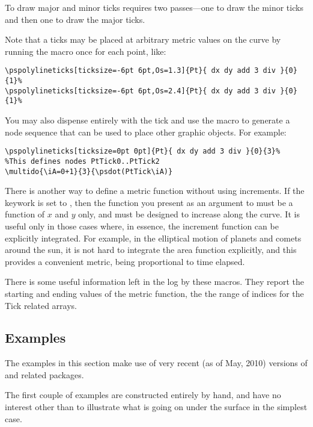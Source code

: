 \documentclass[11pt,english,BCOR10mm,DIV12,bibliography=totoc,parskip=false,smallheadings
    headexclude,footexclude,oneside]{pst-doc}
\begin{document}
To draw major and minor ticks requires two passes---one to draw the minor ticks and then one to draw the major ticks.

Note that a ticks may be placed at arbitrary metric values on the curve by running the macro once for each point, like:
\begin{verbatim}
\pspolylineticks[ticksize=-6pt 6pt,Os=1.3]{Pt}{ dx dy add 3 div }{0}{1}%
\pspolylineticks[ticksize=-6pt 6pt,Os=2.4]{Pt}{ dx dy add 3 div }{0}{1}%
\end{verbatim}

You may also dispense entirely with the tick and use the macro to generate a node sequence 
that can be used to place other graphic objects. For example:
\begin{verbatim}
\pspolylineticks[ticksize=0pt 0pt]{Pt}{ dx dy add 3 div }{0}{3}%
%This defines nodes PtTick0..PtTick2
\multido{\iA=0+1}{3}{\psdot(PtTick\iA)}
\end{verbatim}


There is another way to define a metric function without using increments. If the keywork  is set to \true, 
then the function you present as an argument to  must be a function of 
$x$ and $y$ only, and must be designed to increase along the curve. It is useful only in 
those cases where, in essence, the increment function can be explicitly integrated. 
For example, in the elliptical motion of planets and comets around the sun, it is not hard 
to integrate the area function explicitly, and this provides a convenient metric, being proportional to time elapsed.

There is some useful information left in the log by these macros. 
They report the starting and ending values of the metric function, 
the the range of indices for the Tick related arrays.

\subsection{Examples}
The examples in this section make use of very recent (as of May, 2010) versions 
of  and related packages. 

The first couple of examples are constructed entirely by hand, and have no interest 
other than to illustrate what is going on under the surface in the simplest case.
\end{document}
